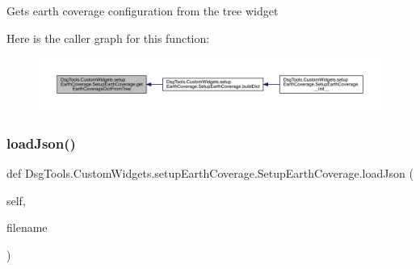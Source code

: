 \begin{DoxyVerb}Gets earth coverage configuration from the tree widget
\end{DoxyVerb}
 Here is the caller graph for this function\+:
\nopagebreak
\begin{figure}[H]
\begin{center}
\leavevmode
\includegraphics[width=350pt]{class_dsg_tools_1_1_custom_widgets_1_1setup_earth_coverage_1_1_setup_earth_coverage_a8a375d3e7081f7b8902deaca7b4f66e6_icgraph}
\end{center}
\end{figure}
\mbox{\label{class_dsg_tools_1_1_custom_widgets_1_1setup_earth_coverage_1_1_setup_earth_coverage_a63be88f7f3d02f50ddfb3f1712937bc7}} 
\subsubsection{\texorpdfstring{load\+Json()}{loadJson()}}
{\footnotesize\ttfamily def Dsg\+Tools.\+Custom\+Widgets.\+setup\+Earth\+Coverage.\+Setup\+Earth\+Coverage.\+load\+Json (\begin{DoxyParamCaption}\item[{}]{self,  }\item[{}]{filename }\end{DoxyParamCaption})}

